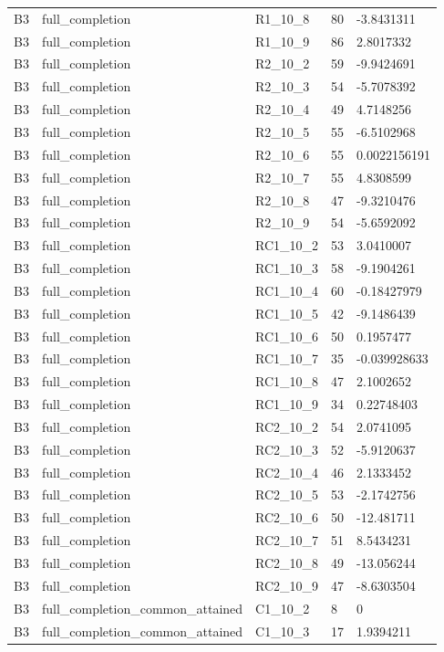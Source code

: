 \begin{longtable}{lllll}
B3 & full\_completion & R1\_10\_8 & 80 & -3.8431311 \\
B3 & full\_completion & R1\_10\_9 & 86 & 2.8017332 \\
B3 & full\_completion & R2\_10\_2 & 59 & -9.9424691 \\
B3 & full\_completion & R2\_10\_3 & 54 & -5.7078392 \\
B3 & full\_completion & R2\_10\_4 & 49 & 4.7148256 \\
B3 & full\_completion & R2\_10\_5 & 55 & -6.5102968 \\
B3 & full\_completion & R2\_10\_6 & 55 & 0.0022156191 \\
B3 & full\_completion & R2\_10\_7 & 55 & 4.8308599 \\
B3 & full\_completion & R2\_10\_8 & 47 & -9.3210476 \\
B3 & full\_completion & R2\_10\_9 & 54 & -5.6592092 \\
B3 & full\_completion & RC1\_10\_2 & 53 & 3.0410007 \\
B3 & full\_completion & RC1\_10\_3 & 58 & -9.1904261 \\
B3 & full\_completion & RC1\_10\_4 & 60 & -0.18427979 \\
B3 & full\_completion & RC1\_10\_5 & 42 & -9.1486439 \\
B3 & full\_completion & RC1\_10\_6 & 50 & 0.1957477 \\
B3 & full\_completion & RC1\_10\_7 & 35 & -0.039928633 \\
B3 & full\_completion & RC1\_10\_8 & 47 & 2.1002652 \\
B3 & full\_completion & RC1\_10\_9 & 34 & 0.22748403 \\
B3 & full\_completion & RC2\_10\_2 & 54 & 2.0741095 \\
B3 & full\_completion & RC2\_10\_3 & 52 & -5.9120637 \\
B3 & full\_completion & RC2\_10\_4 & 46 & 2.1333452 \\
B3 & full\_completion & RC2\_10\_5 & 53 & -2.1742756 \\
B3 & full\_completion & RC2\_10\_6 & 50 & -12.481711 \\
B3 & full\_completion & RC2\_10\_7 & 51 & 8.5434231 \\
B3 & full\_completion & RC2\_10\_8 & 49 & -13.056244 \\
B3 & full\_completion & RC2\_10\_9 & 47 & -8.6303504 \\
B3 & full\_completion\_common\_attained & C1\_10\_2 & 8 & 0 \\
B3 & full\_completion\_common\_attained & C1\_10\_3 & 17 & 1.9394211 \\

\end{longtable}
